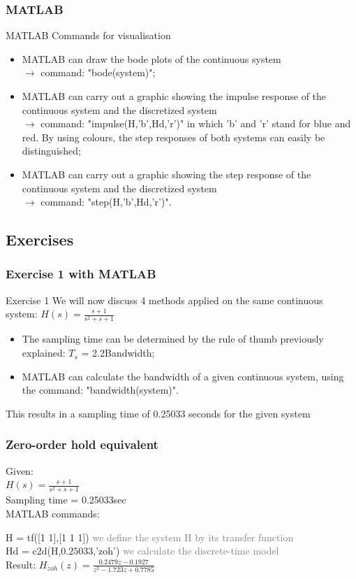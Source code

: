 \begin{frame}
	\frametitle{MATLAB}
	\begin{block}{MATLAB Commands for visualisation}
		\begin{itemize}
			\item MATLAB can draw the bode plots of the continuous system\\ 
			$\rightarrow$ command: "bode(system)";
			\item MATLAB can carry out a graphic showing the impulse response of the continuous system and the discretized system\\
			$\rightarrow$ command: "impulse(H,'b',Hd,'r')" in which 'b' and 'r' stand for blue and red. By using colours, the step responses of both systems can easily be distinguished;
			\item MATLAB can carry out a graphic showing the step response of the continuous system and the discretized system\\
			$\rightarrow$ command: "step(H,'b',Hd,'r')".
		\end{itemize}
	\end{block}
\end{frame}

\subsection{Exercises}
\begin{frame}
	\frametitle{Exercise 1 with MATLAB}
	\begin{block}{Exercise 1}
		We will now discuss 4 methods applied on the same continuous system:
		$H(s) = \frac{s + 1}{s^{2} + s + 1}$\\
		\begin{itemize}
		\item The sampling time can be determined by the rule of thumb previously explained: $T_s$ = 2.2Bandwidth;
		\item MATLAB can calculate the bandwidth of a given continuous system, using the command: "bandwidth(system)".
		\end{itemize}
		This results in a sampling time of 0.25033 seconds for the given system
	\end{block}
\end{frame}

\begin{frame}
	\frametitle{Zero-order hold equivalent}
	\begin{example}
		Given:\\
		$H(s) = \frac{s + 1}{s^{2} + s + 1}$\\
		Sampling time = 0.25033sec\\
		\vspace{0.8em}
		MATLAB commands:
		
		H = tf([1 1],[1 1 1])	\textcolor{gray}{we define the system H by its transfer function}\\
		Hd = c2d(H,$0.25033$,'zoh') \textcolor{gray}{we calculate the discrete-time model}\\
		\vspace{0.8em}
		Result:
		$H_{zoh}(z) = \frac{0.2479z - 0.1927}{z^{2} -1.723z + 0.7785}$
	\end{example}
\end{frame}

